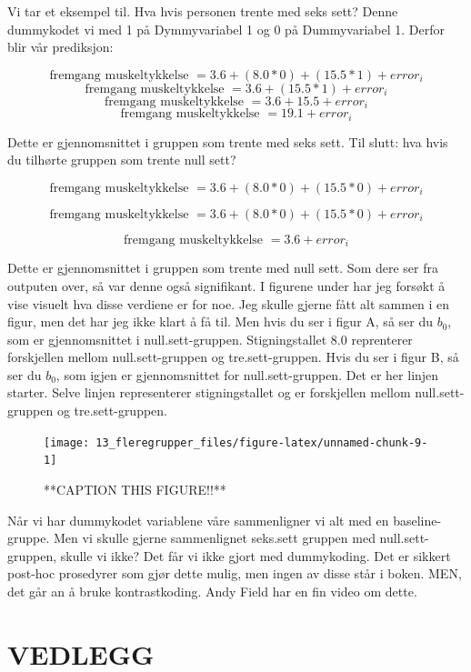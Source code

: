 \documentclass[
]{book}
\begin{document}
Vi tar et eksempel til. Hva hvis personen trente med seks sett? Denne dummykodet vi med 1 på Dymmyvariabel 1 og 0 på Dummyvariabel 1. Derfor blir vår prediksjon:

\[
\text{fremgang muskeltykkelse } = 3.6 + (8.0 * 0) + (15.5 * 1)  + error_i
\]
\[
\text{fremgang muskeltykkelse } = 3.6 + (15.5 * 1)  + error_i
\]
\[
\text{fremgang muskeltykkelse } = 3.6 + 15.5  + error_i
\]
\[
\text{fremgang muskeltykkelse } = 19.1 + error_i
\]

Dette er gjennomsnittet i gruppen som trente med seks sett. Til slutt: hva hvis du tilhørte gruppen som trente null sett?

\[
\text{fremgang muskeltykkelse } = 3.6 + (8.0 * 0) + (15.5 * 0)  + error_i
\]

\[
\text{fremgang muskeltykkelse } = 3.6 + (8.0 * 0) + (15.5 * 0)  + error_i
\]

\[
\text{fremgang muskeltykkelse } = 3.6  + error_i
\]

Dette er gjennomsnittet i gruppen som trente med null sett. Som dere ser fra outputen over, så var denne også signifikant. I figurene under har jeg forsøkt å vise visuelt hva disse verdiene er for noe. Jeg skulle gjerne fått alt sammen i en figur, men det har jeg ikke klart å få til. Men hvis du ser i figur A, så ser du \(b_0\), som er gjennomsnittet i null.sett-gruppen. Stigningstallet 8.0 reprenterer forskjellen mellom null.sett-gruppen og tre.sett-gruppen. Hvis du ser i figur B, så ser du \(b_0\), som igjen er gjennomsnittet for null.sett-gruppen. Det er her linjen starter. Selve linjen representerer stigningstallet og er forskjellen mellom null.sett-gruppen og tre.sett-gruppen.

\begin{figure}

{\centering \texttt{[image: 13\_fleregrupper\_files/figure-latex/unnamed-chunk-9-1]} 

}

\caption{**CAPTION THIS FIGURE!!**}\label{fig:unnamed-chunk-9}
\end{figure}

Når vi har dummykodet variablene våre sammenligner vi alt med en baseline-gruppe. Men vi skulle gjerne sammenlignet seks.sett gruppen med null.sett-gruppen, skulle vi ikke? Det får vi ikke gjort med dummykoding. Det er sikkert post-hoc prosedyrer som gjør dette mulig, men ingen av disse står i boken. MEN, det går an å bruke kontrastkoding. Andy Field har en fin video om dette.

\hypertarget{vedlegg}{%
\chapter{VEDLEGG}\label{vedlegg}}
\end{document}
